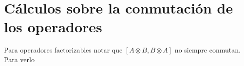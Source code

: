 \section{Cálculos sobre la conmutación de los operadores}
Para operadores factorizables notar que $[A\otimes B, B\otimes A] $ no siempre conmutan. Para verlo
\begin{comment}
se puede escribir cada operador hermítico en la base de las matrices de Pauli, por lo que:


\[A\otimes B=\sum_\alpha a_\alpha \sigma_\alpha\otimes \sum_\beta b_\beta \sigma_\beta.\]



con las letras griegas $\alpha, \beta= 0,1,2,3$ y al realizar el conmutador se obtiene:

\[[A\otimes B, B\otimes A]=(A\otimes B)(B\otimes A)-(B\otimes A)(A\otimes B )\]
\[\begin{split}
    =&\left(\sum_\alpha a_\alpha \sigma_ \alpha \otimes \sum_\beta b_\beta \sigma_\beta \right)\left(\sum_\nu b_\nu \sigma_\nu \otimes \sum_\mu a_\mu\sigma_\mu\right)\\
    -&\left(\sum_\nu b_\nu \sigma_\nu\otimes \sum_\mu a_\mu \sigma_\mu \right)\left(\sum_\alpha a_\alpha \sigma_\alpha\otimes \sum_\beta b_\beta \sigma_\beta\right)\\
    =&\left(\sum_{\alpha \nu} a_\alpha b_\nu\sigma_\alpha\sigma_\nu\otimes \sum_{\beta \mu} b_\beta a_\mu \sigma_\beta\sigma_\mu\right)-\left(\sum_{\nu \alpha} b_\nu a_\alpha \sigma_\nu \sigma_\alpha \otimes \sum_{\mu \beta} a_\mu b_\beta\sigma_\mu \sigma_\beta\right)\\
\end{split}\]
Ahora se descompone la sumatoria y se reescribe con las letras latinas $i,j,k,l=1,2,3$.

\[\begin{split}
    =&\left(a_0b_0\mathds{1}+ \sum_i (a_i b_0+a_0 b_i)\sigma_i+\sum_{ik} a_i b_k\sigma_i\sigma_k\right)\otimes \left(b_0 a_0\mathds{1}+ \sum_j (b_0 a_j+b_j a_0)\sigma_j+\sum_{jl}  b_j a_l\sigma_j\sigma_l\right)\\
    -&\left(b_0a_0\mathds{1}+ \sum_i (b_0 a_i+b_i a_0)\sigma_i+\sum_{ki}b_k a_i \sigma_k\sigma_i\right)\otimes \left(a_0 b_0\mathds{1}+ \sum_j (a_j b_0+a_0b_j)\sigma_j+\sum_{lj} a_l b_j\sigma_l\sigma_j\right)\\
\end{split}\]

Sea $C=b_0a_0\mathds{1}+ \sum_i (b_0 a_i+b_i a_0)\sigma_i$, y se tiene en cuenta que $\sigma_i \sigma_j=\mathds{1}\delta_{ij} +i\varepsilon_{ijk}\sigma_k$, con $\delta_{ij}$ la delta de Kronecker y $\varepsilon_{ijk}$ es el símbolo de Levi-Civita.



\end{comment}
